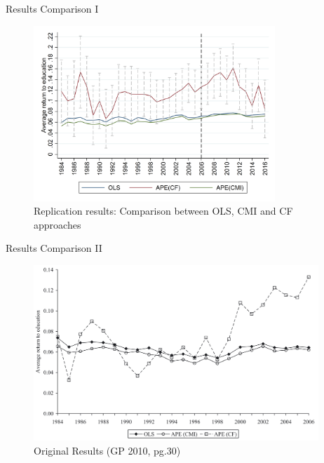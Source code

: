 \documentclass[10pt,ignorenonframetext,]{beamer}
\begin{document}
\begin{frame}{Results Comparison I}
\protect\hypertarget{results-comparison-i}{}

\begin{figure}
\centering
\includegraphics[width=\textwidth,height=2.60417in]{img/results.png}
\caption{Replication results: Comparison between OLS, CMI and CF
approaches}
\end{figure}

\end{frame}

\begin{frame}{Results Comparison II}
\protect\hypertarget{results-comparison-ii}{}

\begin{figure}
\centering
\includegraphics[width=\textwidth,height=2.60417in]{img/OLS_CMI_CF_GB2010.png}
\caption{Original Results (GP 2010, pg.30)}
\end{figure}

\end{frame}
\end{document}
